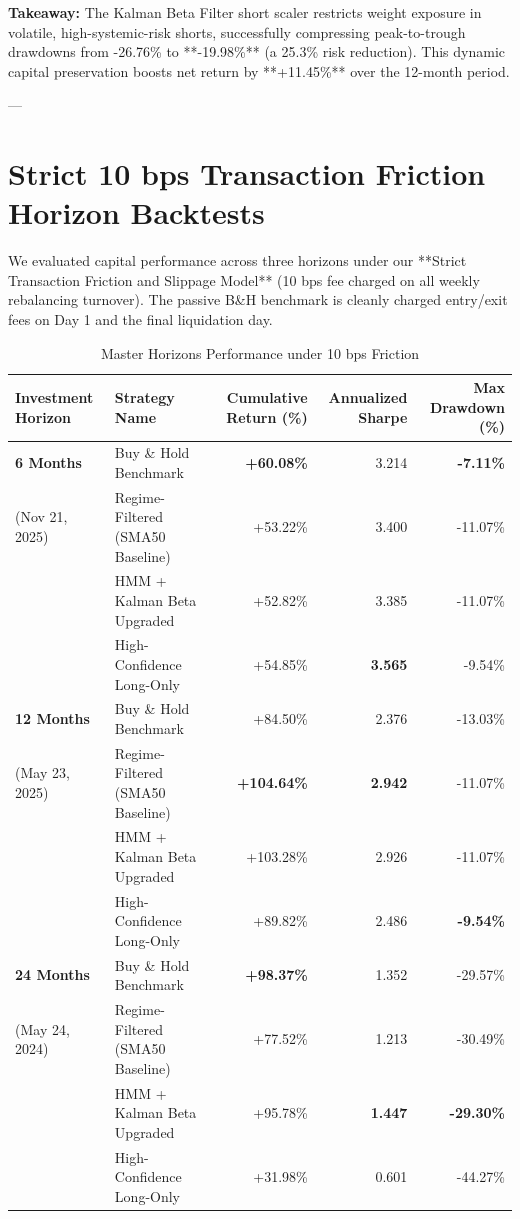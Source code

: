 \documentclass[11pt,article]{article}
\begin{document}
\textbf{Takeaway:} The Kalman Beta Filter short scaler restricts weight exposure in volatile, high-systemic-risk shorts, successfully compressing peak-to-trough drawdowns from -26.76\% to **-19.98\%** (a 25.3\% risk reduction). This dynamic capital preservation boosts net return by **+11.45\%** over the 12-month period.

---

\pagebreak

\section{Strict 10 bps Transaction Friction Horizon Backtests}
We evaluated capital performance across three horizons under our **Strict Transaction Friction and Slippage Model** (10 bps fee charged on all weekly rebalancing turnover). The passive B\&H benchmark is cleanly charged entry/exit fees on Day 1 and the final liquidation day.

\begin{table}[h!]
\centering
\caption{Master Horizons Performance under 10 bps Friction}
\begin{tabular}{llrrr}
\toprule
\textbf{Investment Horizon} & \textbf{Strategy Name} & \textbf{Cumulative Return (\%)} & \textbf{Annualized Sharpe} & \textbf{Max Drawdown (\%)} \\
\midrule
\textbf{6 Months} & Buy \& Hold Benchmark & \textbf{+60.08\%} & 3.214 & \textbf{-7.11\%} \\
\small{(Nov 21, 2025)} & Regime-Filtered (SMA50 Baseline) & +53.22\% & 3.400 & -11.07\% \\
 & HMM + Kalman Beta Upgraded & +52.82\% & 3.385 & -11.07\% \\
 & High-Confidence Long-Only & +54.85\% & \textbf{3.565} & -9.54\% \\
\midrule
\textbf{12 Months} & Buy \& Hold Benchmark & +84.50\% & 2.376 & -13.03\% \\
\small{(May 23, 2025)} & Regime-Filtered (SMA50 Baseline) & \textbf{+104.64\%} & \textbf{2.942} & -11.07\% \\
 & HMM + Kalman Beta Upgraded & +103.28\% & 2.926 & -11.07\% \\
 & High-Confidence Long-Only & +89.82\% & 2.486 & \textbf{-9.54\%} \\
\midrule
\textbf{24 Months} & Buy \& Hold Benchmark & \textbf{+98.37\%} & 1.352 & -29.57\% \\
\small{(May 24, 2024)} & Regime-Filtered (SMA50 Baseline) & +77.52\% & 1.213 & -30.49\% \\
 & HMM + Kalman Beta Upgraded & +95.78\% & \textbf{1.447} & \textbf{-29.30\%} \\
 & High-Confidence Long-Only & +31.98\% & 0.601 & -44.27\% \\
\bottomrule
\end{tabular}
\end{table}
\end{document}
